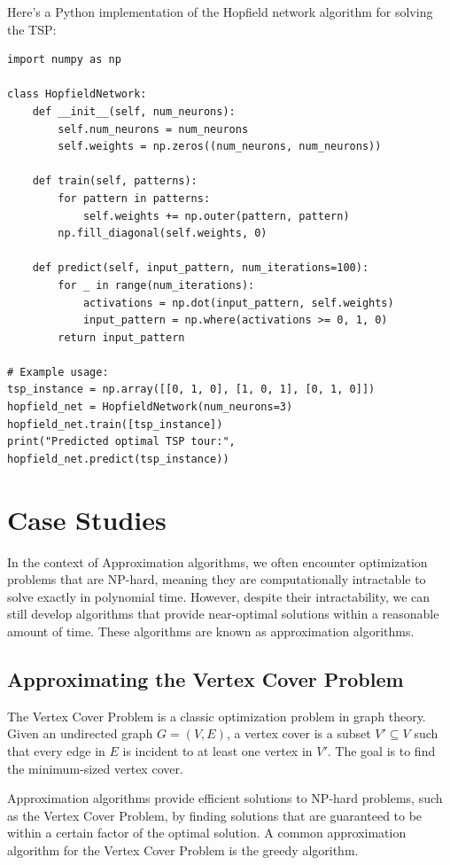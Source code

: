 \documentclass[12pt]{book} %
\begin{document}
Here's a Python implementation of the Hopfield network algorithm for solving the TSP:
\FloatBarrier
\begin{lstlisting}
import numpy as np

class HopfieldNetwork:
    def __init__(self, num_neurons):
        self.num_neurons = num_neurons
        self.weights = np.zeros((num_neurons, num_neurons))
    
    def train(self, patterns):
        for pattern in patterns:
            self.weights += np.outer(pattern, pattern)
        np.fill_diagonal(self.weights, 0)
    
    def predict(self, input_pattern, num_iterations=100):
        for _ in range(num_iterations):
            activations = np.dot(input_pattern, self.weights)
            input_pattern = np.where(activations >= 0, 1, 0)
        return input_pattern

# Example usage:
tsp_instance = np.array([[0, 1, 0], [1, 0, 1], [0, 1, 0]])
hopfield_net = HopfieldNetwork(num_neurons=3)
hopfield_net.train([tsp_instance])
print("Predicted optimal TSP tour:", hopfield_net.predict(tsp_instance))
\end{lstlisting}
\FloatBarrier

\section{Case Studies}

In the context of Approximation algorithms, we often encounter optimization problems that are NP-hard, meaning they are computationally intractable to solve exactly in polynomial time. However, despite their intractability, we can still develop algorithms that provide near-optimal solutions within a reasonable amount of time. These algorithms are known as approximation algorithms.

\subsection{Approximating the Vertex Cover Problem}

The Vertex Cover Problem is a classic optimization problem in graph theory. Given an undirected graph \( G = (V, E) \), a vertex cover is a subset \( V' \subseteq V \) such that every edge in \( E \) is incident to at least one vertex in \( V' \). The goal is to find the minimum-sized vertex cover.


Approximation algorithms provide efficient solutions to NP-hard problems, such as the Vertex Cover Problem, by finding solutions that are guaranteed to be within a certain factor of the optimal solution. A common approximation algorithm for the Vertex Cover Problem is the greedy algorithm.
\end{document}
